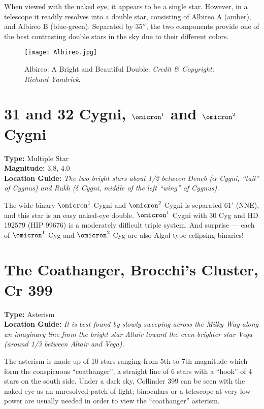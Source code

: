 When viewed with the naked eye, it appears to be a single
star. However, in a telescope it readily resolves into a double star,
consisting of Albireo A (amber), and Albireo B (blue-green). Separated
by 35$''$, the two components provide one of the best contrasting
double stars in the sky due to their different colors.

\begin{figure}[ht]
\texttt{[image: Albireo.jpg]}
\caption{Albireo: A Bright and Beautiful Double. \emph{Credit \& Copyright: Richard Yandrick}.}
\label{fig:Albireo}
\end{figure}

\section{31 and 32 Cygni, \texorpdfstring{$\omicron^1$ and $\omicron^2$}{omicron1 and omicron2} Cygni}
\textbf{Type:} Multiple Star \\
\textbf{Magnitude:} 3.8, 4.0 \\
\textbf{Location Guide:} \textit{The two bright stars about 1/2
  between Deneb ($\alpha$ Cygni, ``tail'' of Cygnus) and Rukh
  ($\delta$ Cygni, middle of the left ``wing'' of Cygnus).}

The wide binary $\omicron^1$ Cygni and $\omicron^2$ Cygni is separated
61$'$ (NNE), and this star is an easy naked-eye double. $\omicron^1$
Cygni with 30 Cyg and HD 192579 (HIP 99676) is a moderately difficult
triple system. And surprise --- each of $\omicron^1$ Cyg and
$\omicron^2$ Cyg are also Algol-type eclipsing binaries!

\section{The Coathanger, Brocchi's Cluster, Cr 399}
\textbf{Type:} Asterism \\
\textbf{Location Guide:} \textit{It is best found by slowly sweeping
  across the Milky Way along an imaginary line from the bright star
  Altair toward the even brighter star Vega (around 1/3 between Altair
  and Vega).}

The asterism is made up of 10 stars ranging from 5th to 7th magnitude
which form the conspicuous ``coathanger'', a straight line of 6 stars
with a ``hook'' of 4 stars on the south side. Under a dark sky,
Collinder 399 can be seen with the naked eye as an unresolved patch of
light; binoculars or a telescope at very low power are usually needed
in order to view the ``coathanger'' asterism.

